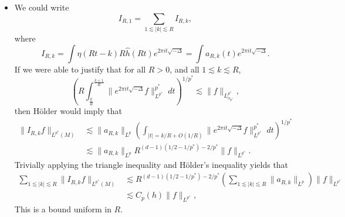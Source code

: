 \begin{itemize}
    \item We could write
    \[ I_{R,1} = \sum_{1 \lesssim |k| \lesssim R} I_{R,k}, \]
    where
    \[ I_{R,k} = \int \eta(Rt - k) R \widehat{h}(Rt) e^{2 \pi i t \sqrt{-\Delta}} = \int a_{R,k}(t) e^{2 \pi i t \sqrt{-\Delta}}. \]
    If we were able to justify that for all $R > 0$, and all $1 \lesssim k \lesssim R$,
    \[ \left( R \int_{\frac{k}{R}}^{\frac{k + 1}{R}} \| e^{2 \pi i t \sqrt{-\Delta}} f \|_{L^{p^*}}^{p^*}\; dt \right)^{1/p^*} \lesssim \| f \|_{L^{p^*}_{\alpha_{p^*}}}, \]
    then H\"{o}lder would imply that
    \begin{align*}
        \| I_{R,k} f \|_{L^{p^*}(M)} &\lesssim \| a_{R,k} \|_{L^p} \left( \int_{|t| = k/R + O(1/R)} \| e^{2 \pi i t \sqrt{-\Delta}} f \|_{L^{p^*}}^{p^*}\; dt \right)^{1/p^*}\\
        &\lesssim \| a_{R,k} \|_{L^p} R^{(d-1)(1/2 - 1/p^*)-2/p^*} \| f \|_{L^{p^*}}.
    \end{align*}
    Trivially applying the triangle inequality and H\"{o}lder's inequality yields that
    \begin{align*}
        \sum_{1 \lesssim |k| \lesssim R} \| I_{R,k} f \|_{L^{p^*}(M)} &\lesssim R^{(d-1)(1/2 - 1/p^*)-2/p^*} \left( \sum_{1 \lesssim |k| \lesssim R} \| a_{R,k} \|_{L^p} \right) \| f \|_{L^{p^*}}\\
        &\lesssim C_p(h) \| f \|_{L^{p^*}},
    \end{align*}
    This is a bound uniform in $R$.


\end{itemize}
